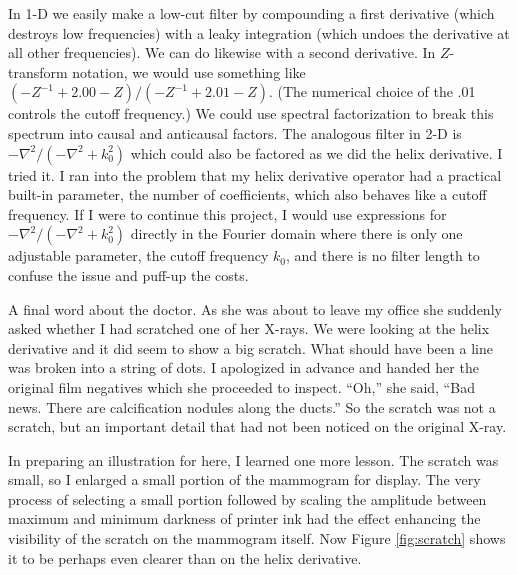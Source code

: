 \par
In 1-D we easily make a low-cut filter
by compounding a first derivative (which destroys low frequencies)
with a leaky integration (which undoes the derivative at all other frequencies).
We can do likewise with a second derivative.
In $Z$-transform notation, we would use something like
$ (-Z^{-1} + 2.00 - Z) / (-Z^{-1} + 2.01 - Z)$.
(The numerical choice of the .01 controls the cutoff frequency.)
We could use spectral factorization to break this spectrum into
causal and anticausal factors.
The analogous filter in 2-D is
$-\nabla^2 /(-\nabla^2 + k_0^2)$
which could also be factored as we did the helix derivative.
I tried it.
I ran into the problem that my helix derivative operator
had a practical built-in parameter, the number of coefficients,
which also behaves like a cutoff frequency.
If I were to continue this project,
I would use expressions for
$-\nabla^2 /(-\nabla^2 + k_0^2)$
directly in the Fourier domain where there is only one adjustable parameter,
the cutoff frequency $k_0$,
and there is no filter length to confuse the issue and puff-up the costs.


\par
A final word about the doctor.
As she was about to leave my office she suddenly asked
whether I had scratched one of her X-rays.
We were looking at the helix derivative
and it did seem to show a big scratch.
What should have been a line was broken into a string of dots.
I apologized in advance and handed her the original film negatives
which she proceeded to inspect.
``Oh,'' she said,
``Bad news. There are calcification nodules along the ducts.''
So the scratch was not a scratch,
but an important detail that had not been noticed on the original X-ray.

\par
In preparing an illustration for here,
I learned one more lesson.
The scratch was small,
so I enlarged a small portion of the mammogram for display.
The very process of selecting a small portion
followed by scaling the amplitude
between maximum and minimum darkness of printer ink
had the effect enhancing the visibility of the scratch on
the mammogram itself.
Now Figure \ref{fig:scratch} shows it to be
perhaps even clearer than on the helix derivative.

